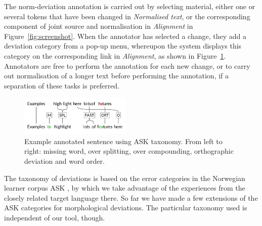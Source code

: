 \documentclass[10pt, a4paper]{article}
\newcommand{\mats}[1]{{\color{Blue}{Mats: #1}}}
\begin{document}
The norm-deviation annotation is carried out by selecting material, either
one or several tokens that have been changed in {\em Normalised text},
or the corresponding component of joint source and normalisation in {\em Alignment} in Figure~\ref{fig:screenshot}.
When the annotator has selected a change, they add a deviation
category from a pop-up menu, whereupon the system displays this category on the
corresponding link in {\em Alignment}, as shown in Figure~\ref{fig:normann}.
Annotators are free to perform the annotation for each new change, or to carry out normalisation of a longer text before performing the annotation, if a separation of these tasks is preferred.


\begin{figure}[t] %
\includegraphics[height=1.9cm, trim={-0.5cm 0.55cm 0 0.1cm}, clip]{features7.pdf}
\caption{Example annotated sentence using ASK taxonomy. From left to right:
missing word, over splitting, over compounding, orthographic deviation and
word order.
\label{fig:normann}}
\end{figure}

The taxonomy of deviations is based on the error categories in the Norwegian
learner corpus ASK \cite{tenfjord2006ask}, by which we take advantage of the experiences from the closely related target language there. So far we have made a few extensions of the ASK categories for morphological deviations. The particular taxonomy used is independent of our tool, though.


\end{document}

